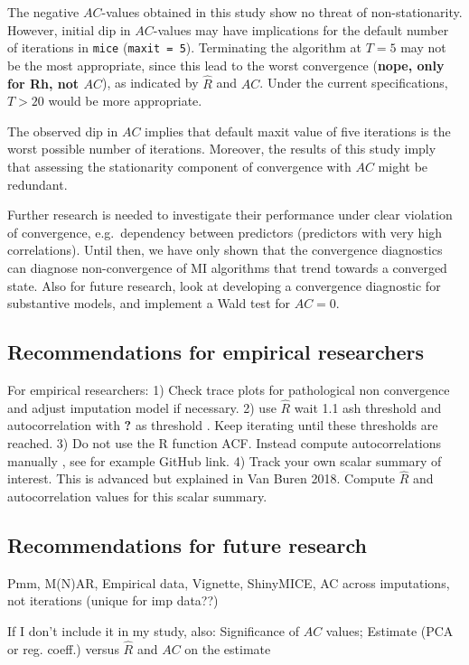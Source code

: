 \documentclass[Royal,times,sageh]{sagej}
\begin{document}
The negative \(AC\)-values obtained in this study show no threat of
non-stationarity. However, initial dip in \(AC\)-values may have
implications for the default number of iterations in \texttt{mice}
(\texttt{maxit\ =\ 5}). Terminating the algorithm at \(T=5\) may not be
the most appropriate, since this lead to the worst convergence
(\textbf{nope, only for Rh, not \(AC\)}), as indicated by
\(\widehat{R}\) and \(AC\). Under the current specifications, \(T>20\)
would be more appropriate.

The observed dip in \(AC\) implies that default maxit value of five
iterations is the worst possible number of iterations. Moreover, the
results of this study imply that assessing the stationarity component of
convergence with \(AC\) might be redundant.

Further research is needed to investigate their performance under clear
violation of convergence, e.g.~dependency between predictors (predictors
with very high correlations). Until then, we have only shown that the
convergence diagnostics can diagnose non-convergence of MI algorithms
that trend towards a converged state. Also for future research, look at
developing a convergence diagnostic for substantive models, and
implement a Wald test for \(AC = 0\).

\hypertarget{recommendations-for-empirical-researchers}{%
\subsection{Recommendations for empirical
researchers}\label{recommendations-for-empirical-researchers}}

For empirical researchers: 1) Check trace plots for pathological non
convergence and adjust imputation model if necessary. 2) use
\(\widehat{R}\) wait 1.1 ash threshold and autocorrelation with
\textbf{?} as threshold . Keep iterating until these thresholds are
reached. 3) Do not use the R function ACF. Instead compute
autocorrelations manually , see for example GitHub link. 4) Track your
own scalar summary of interest. This is advanced but explained in Van
Buren 2018. Compute \(\widehat{R}\) and autocorrelation values for this
scalar summary.

\hypertarget{recommendations-for-future-research}{%
\subsection{Recommendations for future
research}\label{recommendations-for-future-research}}

Pmm, M(N)AR, Empirical data, Vignette, ShinyMICE, AC across imputations,
not iterations (unique for imp data??)

If I don't include it in my study, also: Significance of \(AC\) values;
Estimate (PCA or reg. coeff.) versus \(\widehat{R}\) and \(AC\) on the
estimate



\end{document}
